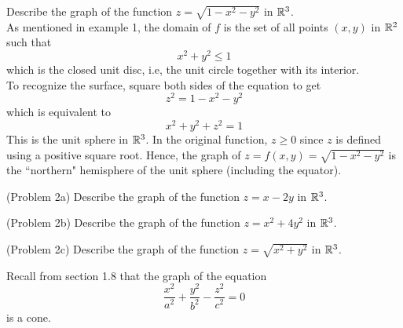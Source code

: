 \documentclass[handout]{ximera}
\begin{document}
\begin{example}[Example 2]
Describe the graph of the function $z = \sqrt{1 - x^2 - y^2}$ in $\mathbb R^3$.\\
As mentioned in example 1, the domain of $f$ is the set of all points $(x, y)$ in $\mathbb R^2$ such that
\[
x^2 + y^2 \leq 1
\]
which is the closed unit disc, i.e, the unit circle together with its interior.\\
To recognize the surface, square both sides of the equation to get
\[
z^2 = 1 - x^2 - y^2
\]
which is equivalent to
\[
x^2 + y^2 + z^2 = 1
\]
This is the unit sphere in $\mathbb R^3$. In the original function, $z\geq 0$ since $z$ is defined using a positive square root. 
Hence, the graph of $z = f(x, y) = \sqrt{1 - x^2 - y^2}$ is the ``northern" hemisphere of the unit sphere (including the equator).
\end{example}



\begin{problem}(Problem 2a)
Describe the graph of the function $z = x - 2y$ in $\mathbb R^3$.\\
\end{problem}

\begin{problem}(Problem 2b)
Describe the graph of the function $z = x^2 + 4y^2$ in $\mathbb R^3$.\\
\end{problem}

\begin{problem}(Problem 2c)
Describe the graph of the function $z = \sqrt{x^2 + y^2}$ in $\mathbb R^3$.\\
\begin{hint}
Recall from section 1.8 that the graph of the equation
\[
\frac{x^2}{a^2} + \frac{y^2}{b^2} - \frac{z^2}{c^2} = 0
\]
is a cone.
\end{hint}
\end{problem}
\end{document}
